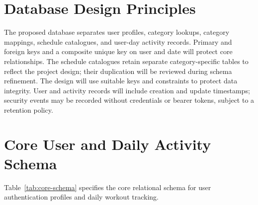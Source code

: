 \documentclass[11pt,a4paper]{report}
\begin{document}
\section{Database Design Principles}
The proposed database separates user profiles, category lookups, category mappings, schedule catalogues, and user-day activity records. Primary and foreign keys and a composite unique key on user and date will protect core relationships. The schedule catalogues retain separate category-specific tables to reflect the project design; their duplication will be reviewed during schema refinement. The design will use suitable keys and constraints to protect data integrity. User and activity records will include creation and update timestamps; security events may be recorded without credentials or bearer tokens, subject to a retention policy.

\section{Core User and Daily Activity Schema}
Table~\ref{tab:core-schema} specifies the core relational schema for user authentication profiles and daily workout tracking.
\end{document}
